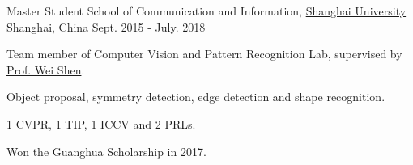 \begin{cventries}
  \cventry
    {Master Student} %
    {School of Communication and Information, \href{http://www.shu.edu.cn}{Shanghai University}} %
    {Shanghai, China} %
    {Sept. 2015 - July. 2018} %
    {
      \begin{cvitems} %
        \item {Team member of Computer Vision and Pattern Recognition Lab, supervised by \href{http://wei-shen.weebly.com}{Prof. Wei Shen}.}
        \item {Object proposal, symmetry detection, edge detection and shape recognition.}
        \item {1 CVPR, 1 TIP, 1 ICCV and 2 PRLs.}
        \item {Won the Guanghua Scholarship in 2017.}
      \end{cvitems}
    }

\end{cventries}
